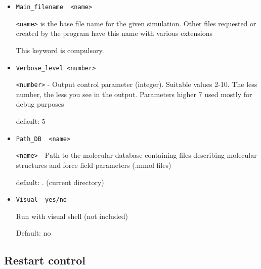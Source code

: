 \documentclass{article}
\begin{document}
\begin{itemize}
\item
\verb|Main_filename  <name>|

\verb|<name>| is the base file name for the given simulation. 
Other files requested or created by the program have this name with 
various extensions
 
This keyword is compulsory.

\item
\verb|Verbose_level <number>|

\verb|<number>| - Output control parameter (integer). 
Suitable values 2-10. The less number, the less you see in the output.
Parameters higher 7 used mostly for debug purposes  

default: 5

\item
\verb|Path_DB  <name>|

\verb|<name>| - Path to the molecular database containing files describing 
molecular structures and force field parameters (.mmol files)

default:  .       (current directory)

\item
\verb|Visual  yes/no|

Run with visual shell (not included)

Default: no

\end{itemize}

\subsection{Restart control}
\end{document}
